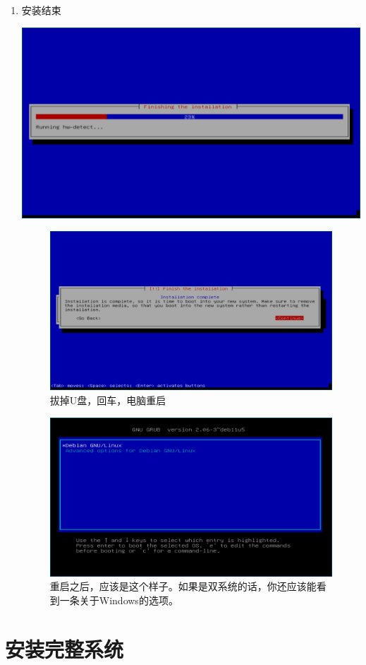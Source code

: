\documentclass{wx672ctexart} \usepackage{hyperref}
\begin{document}
\begin{enumerate}
\item 安装结束

\begin{center}
\includegraphics[width=.5\linewidth]{screenshots/29.png}
\end{center}

\begin{figure}[htbp]
\centering
\includegraphics[width=.5\linewidth]{screenshots/30.png}
\caption{拔掉U盘，回车，电脑重启}
\end{figure}

\begin{figure}[htbp]
\centering
\includegraphics[width=.5\linewidth]{screenshots/31.png}
\caption{重启之后，应该是这个样子。如果是双系统的话，你还应该能看到一条关于Windows的选项。}
\end{figure}
\end{enumerate}

\section{安装完整系统}
\label{sec:org72fcbfc}
\end{document}

